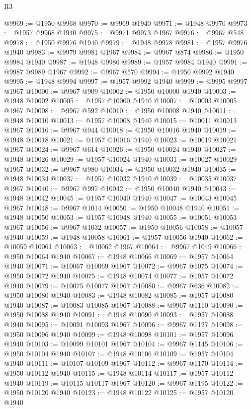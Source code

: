 \begin{lexlean}{R3}
\begin{coremodule}
@9969 := @1950 @9968
@9970 := @9969 @1940
@9971 := @1948 @9970
@9973 := @1957 @9968 @1940
@9975 := @9971 @9973 @1967
@9976 := @9967 @548
@9978 := @1950 @9976 @1940
@9979 := @1948 @9978
@9981 := @1957 @9976 @1940
@9983 := @9979 @9981 @1967
@9984 := @9967 @874
@9986 := @1950 @9984 @1940
@9987 := @1948 @9986
@9989 := @1957 @9984 @1940
@9991 := @9987 @9989 @1967
@9992 := @9967 @570
@9994 := @1950 @9992 @1940
@9995 := @1948 @9994
@9997 := @1957 @9992 @1940
@9999 := @9995 @9997 @1967
@10000 := @9967 @909
@10002 := @1950 @10000 @1940
@10003 := @1948 @10002
@10005 := @1957 @10000 @1940
@10007 := @10003 @10005 @1967
@10008 := @9967 @592
@10010 := @1950 @10008 @1940
@10011 := @1948 @10010
@10013 := @1957 @10008 @1940
@10015 := @10011 @10013 @1967
@10016 := @9967 @944
@10018 := @1950 @10016 @1940
@10019 := @1948 @10018
@10021 := @1957 @10016 @1940
@10023 := @10019 @10021 @1967
@10024 := @9967 @614
@10026 := @1950 @10024 @1940
@10027 := @1948 @10026
@10029 := @1957 @10024 @1940
@10031 := @10027 @10029 @1967
@10032 := @9967 @980
@10034 := @1950 @10032 @1940
@10035 := @1948 @10034
@10037 := @1957 @10032 @1940
@10039 := @10035 @10037 @1967
@10040 := @9967 @997
@10042 := @1950 @10040 @1940
@10043 := @1948 @10042
@10045 := @1957 @10040 @1940
@10047 := @10043 @10045 @1967
@10048 := @9967 @1014
@10050 := @1950 @10048 @1940
@10051 := @1948 @10050
@10053 := @1957 @10048 @1940
@10055 := @10051 @10053 @1967
@10056 := @9967 @1032
@10057 := @1950 @10056
@10058 := @10057 @1940
@10059 := @1948 @10058
@10061 := @1957 @10056 @1940
@10062 := @10059 @10061
@10063 := @10062 @1967
@10064 := @9967 @1049
@10066 := @1950 @10064 @1940
@10067 := @1948 @10066
@10069 := @1957 @10064 @1940
@10071 := @10067 @10069 @1967
@10072 := @9967 @1075
@10074 := @1950 @10072 @1940
@10075 := @1948 @10074
@10077 := @1957 @10072 @1940
@10079 := @10075 @10077 @1967
@10080 := @9967 @636
@10082 := @1950 @10080 @1940
@10083 := @1948 @10082
@10085 := @1957 @10080 @1940
@10087 := @10083 @10085 @1967
@10088 := @9967 @1110
@10090 := @1950 @10088 @1940
@10091 := @1948 @10090
@10093 := @1957 @10088 @1940
@10095 := @10091 @10093 @1967
@10096 := @9967 @1127
@10098 := @1950 @10096 @1940
@10099 := @1948 @10098
@10101 := @1957 @10096 @1940
@10103 := @10099 @10101 @1967
@10104 := @9967 @1145
@10106 := @1950 @10104 @1940
@10107 := @1948 @10106
@10109 := @1957 @10104 @1940
@10111 := @10107 @10109 @1967
@10112 := @9967 @1170
@10114 := @1950 @10112 @1940
@10115 := @1948 @10114
@10117 := @1957 @10112 @1940
@10119 := @10115 @10117 @1967
@10120 := @9967 @1195
@10122 := @1950 @10120 @1940
@10123 := @1948 @10122
@10125 := @1957 @10120 @1940

\end{coremodule}
\end{lexlean}
